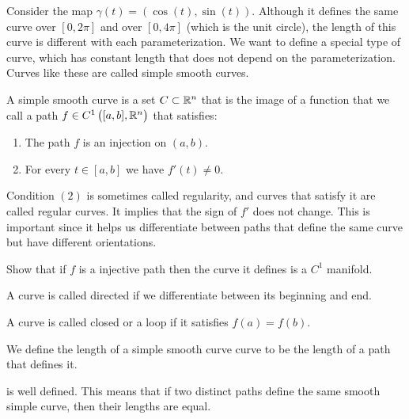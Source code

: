 \documentclass[11pt,a4paper]{article}
\begin{document}
\begin{remark}
  Consider the map $\gamma(t) = (\cos(t),\sin(t))$.
  Although it defines the same curve over $[0,2\pi]$ and over
  $[0,4\pi]$ (which is the unit circle),
  the length of this curve is different with each parameterization.
  We want to define a special type of curve, which has constant length
  that does not depend on the parameterization.
  Curves like these are called simple smooth curves.
\end{remark}

\begin{definition}
  \label{def:simple-smooth-curve}
  A simple smooth curve is a set $C \subset \mathbb{R}^n$ that
  is the image of a function that we call a
  path $f \in C^1\del{[a,b],\R^n}$ that satisfies:
  \begin{enumerate}
    \item[(1)] The path $f$ is an injection on $(a,b)$.
    \item[(2)] For every $t \in [a,b]$ we have $f'(t) \neq 0$.
  \end{enumerate}
\end{definition}
\begin{remark}
  Condition $(2)$ is sometimes called
  regularity, and curves that satisfy it are called regular curves.
  It implies that the sign of $f'$ does not change.
  This is important since it helps us differentiate between paths that
  define the same curve but have different orientations.
\end{remark}

\begin{exercise}
  Show that if $f$ is a injective path then the curve it defines is
  a $C^1$ manifold.
\end{exercise}

\begin{definition}
  A curve is called directed if we differentiate between
  its beginning and end.
\end{definition}
\begin{definition}
  A curve is called closed or a loop if it satisfies $f(a) = f(b)$.
\end{definition}
\begin{definition}
  \label{def:length-of-curve}
  We define the length of a
  simple smooth curve curve to be the length of a path that defines it.
\end{definition}

\begin{proposition}
   is well defined.
  This means that if two distinct paths define the same
  smooth simple curve, then their lengths are equal.
\end{proposition}
\end{document}
